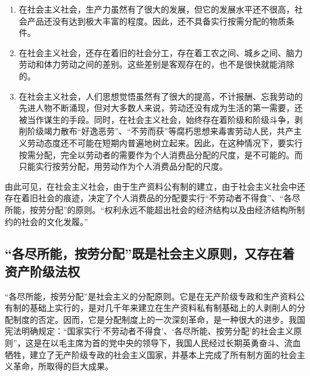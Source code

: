 \documentclass{book}
\begin{document}
 \begin{enumerate}

\item 在社会主义社会，生产力虽然有了很大的发展，但它的发展水平还不很高，社会产品还没有达到极大丰富的程度。因此，还不具备实行按需分配的物质条件。
\item 在社会主义社会，还存在着旧的社会分工，存在着工农之间、城乡之间、脑力劳动和体力劳动之间的差别。这些差别是客观存在的，也不是很快就能消除的。
\item 在社会主义社会，人们思想觉悟虽然有了很大的提高，不计报酬、忘我劳动的先进人物不断涌现，但对大多数人来说，劳动还没有成为生活的第一需要，还被当作谋生的手段。同时，在社会主义社会，始终存在着阶级和阶级斗争，剥削阶级竭力散布“好逸恶劳”、“不劳而获”等腐朽思想来毒害劳动人民，共产主义劳动态度还不可能在短期内普遍地树立起来。因此，在这种情况下，要实行按需分配，完全以劳动者的需要作为个人消费品分配的尺度，是不可能的。而只能实行按劳分配，用劳动作为个人消费品分配的尺度。

 \end{enumerate}

由此可见，在社会主义社会，由于生产资料公有制的建立，由于社会主义社会中还存在着旧社会的痕迹，决定了个人消费品的分配要实行“不劳动者不得食”、“各尽所能，按劳分配”的原则。“权利永远不能超出社会的经济结构以及由经济结构所制约的社会的文化发履。”

\subsection{“各尽所能，按劳分配”既是社会主义原则，又存在着资产阶级法权}

“各尽所能，按劳分配”是社会主义的分配原则。它是在无产阶级专政和生产资料公有制的基础上实行的，是对几千年来建立在生产资料私有制基础上的人剥削人的分配制度的否定。因而，它是分配制度上的一次深刻革命，是一种很大的进步。我国宪法明确规定：“国家实行‘不劳动者不得食’、‘各尽所能、按劳分配’的社会主义原则”，这是在以毛主席为首的党中央的领导下，我国人民经过长期英勇奋斗、流血牺牲，建立了无产阶级专政的社会主义国家，并基本上完成了所有制方面的社会主义革命，所取得的巨大成果。
\end{document}
